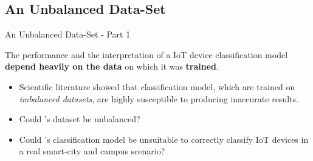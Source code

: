 \documentclass[13.5pt]{beamer}
\begin{document}
\subsection{An Unbalanced Data-Set}
\begin{frame}{An Unbalanced Data-Set - Part 1}

\begin{block}{}
\justifying
The performance and the interpretation of a IoT device classification model \textbf{depend heavily on the data} on which it was \textbf{trained}. 

\begin{itemize}
\justifying
\item Scientific literature showed that classification model, which are trained on \textit{imbalanced datasets}, are highly susceptible to producing inaccurate results. 
\end{itemize}
\end{block}

\begin{alertblock}{}
\begin{itemize}
\justifying
\item Could \citet{ITPAReport}'s dataset be unbalanced? 

\item Could \citet{ITPAReport}'s classification model be unsuitable to correctly classify IoT devices in a real smart-city and campus scenario?
\end{itemize}
\end{alertblock}

\end{frame} 
\end{document}
